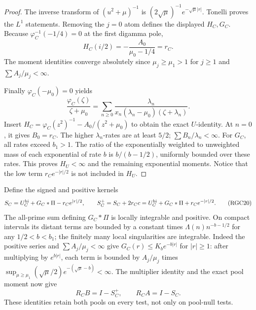 \documentclass[11pt]{article}
\theoremstyle{remark}\newtheorem{remark}[theorem]{Remark}
\begin{document}
\begin{proof}
The inverse transform of \((u^2+\mu)^{-1}\) is
\((2\sqrt\mu)^{-1}e^{-\sqrt\mu|r|}\).
Tonelli proves the \(L^1\) statements. Removing the \(j=0\)
atom defines the displayed \(H_C,G_C\). Because
\(\varphi_C^{-1}(-1/4)=0\) at the first digamma pole,
\[
 H_C(i/2)=-\frac{A_0}{\mu_0-1/4}=r_C.
 \tag{RGC18}
\]
The moment identities converge absolutely since \(\mu_j\ge\mu_1>1\)
for \(j\ge1\) and \(\sum A_j/\mu_j<\infty\).

Finally \(\varphi_C(-\mu_0)=0\) yields
\[
 \frac{\varphi_C(\zeta)}{\zeta+\mu_0}
   =\sum_{n\ge0}
      \frac{\lambda_n}{x_n(\lambda_n-\mu_0)(\zeta+\lambda_n)}.
 \tag{RGC19}
\]
Insert \(H_C=\varphi_C(z^2)^{-1}-A_0/(z^2+\mu_0)\)
to obtain the exact \(U\)-identity. At \(n=0\), it gives \(B_0=r_C\).
The higher \(\lambda_n\)-rates are at least \(5/2\);
\(\sum B_n/\lambda_n<\infty\). For \(G_C\), all rates exceed \(b_1>1\).
The ratio of the exponentially weighted to unweighted mass of
each exponential of rate \(b\) is \(b/(b-1/2)\), uniformly bounded
over these rates. This proves \(H_U<\infty\) and the remaining
exponential moments. Notice that the low term
\(r_Ce^{-|r|/2}\) is not included in \(H_U\).
\end{proof}

Define the signed and positive kernels
\[
 S_C=U_C^{\rm hi}+G_C*\Pi-r_Ce^{|r|/2},
 \qquad
 S_C^+=S_C+2r_Cc
       =U_C^{\rm hi}+G_C*\Pi+r_Ce^{-|r|/2}.
 \tag{RGC20}
\]
The all-prime sum defining \(G_C*\Pi\) is locally integrable and
positive. On compact intervals its distant terms are bounded by
a constant times \(\Lambda(n)n^{-b-1/2}\) for any
\(1/2<b<b_1\); the finitely many local singularities are integrable.
Indeed the positive series and \(\sum A_j/\mu_j<\infty\) give
\(G_C(r)\le K_be^{-b|r|}\) for \(|r|\ge1\): after multiplying
by \(e^{b|r|}\), each term is bounded by \(A_j/\mu_j\) times
\(\sup_{\mu\ge\mu_1}(\sqrt\mu/2)e^{-(\sqrt\mu-b)}<\infty\).
The multiplier identity and the exact pool moment now give
\[
 R_CB=I-S_C^+,\qquad R_CA=I-S_C.
 \tag{RGC21}
\]
These identities retain both pools on every test, not only on
pool-null tests.
\end{document}
